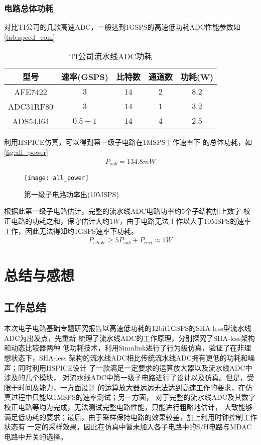     \subsubsection{电路总体功耗}
    对比TI公司的几款高速ADC，一般达到1GSPS的高速低功耗ADC性能参数如\autoref{tab:speed_com}
    \begin{table}[ht]
        \centering
        \caption{\label{tab:speed_com}TI公司流水线ADC功耗}
        \begin{tabular}{|c|c|c|c|c|}
            \hline
            型号 & 速率(GSPS) & 比特数 & 通道数 & 功耗(W) \\ \hline
            AFE7422 & $3$ & $ 14 $ & $2$ & $ 8.2 $ \\ \hline
            ADC31RF80 & $3$ & $ 14 $ & $1$ & $ 3.2 $ \\ \hline
            ADS54J64 & $0.5-1$ & $ 14 $ & $4$ & $ 2.5 $ \\ \hline
        \end{tabular}
    \end{table}
    \par 利用HSPICE仿真，可以得到第一级子电路在1MSPS工作速率下
    的总体功耗，如\autoref{fig:all_power}
    \begin{align}
        P_{sub} = 134.8mW
    \end{align}
    \begin{figure}[H]
        \centering
        \texttt{[image: all\_power]}
        \caption{\label{fig:all_power}第一级子电路功率出(10MSPS)}
    \end{figure}
    \par 根据此第一级子电路估计，完整的流水线ADC电路功率约5个子结构加上数字
    校正电路的功耗之和，保守估计大约$ 1W $，由于电路无法工作以大于10MSPS的速率
    工作，因此无法得知约1GSPS速率下功耗。
    \begin{align}
        P_{whole} \geq 5P_{sub} + P_{rect} \approx 1W
    \end{align}

\section{总结与感想}
    \subsection{工作总结}
    本次电子电路基础专题研究报告以高速低功耗的12bit1GSPS的SHA-less型流水线ADC为出发点，先重新
    梳理了流水线ADC的工作原理，分别探究了SHA-less架构和动态比较器两种
    低功耗技术，利用Simulink进行了行为级仿真，验证了在非理想状态下，SHA-less
    架构的流水线ADC相比传统流水线ADC拥有更低的功耗和噪声；同时利用HSPICE设计
    了一款满足一定要求的运算放大器以及流水线ADC中涉及的几个模块，
    对流水线ADC中第一级子电路进行了设计以及仿真。但是，受限于时间及能力，一方面设计
    的运算放大器远远无法达到高速工作的要求，在仿真过程中只能以1MSPS的速率测试；另一方面，
    对于完整的流水线ADC及其数字校正电路等均为完成，无法测试完整电路性能，只能进行粗略地估计，
    大致能够满足低功耗的要求；最后，由于采样保持电路的效果较差，加上利用时钟控制工作状态有
    一定的采样效果，因此在仿真中暂未加入各子电路中的S/H电路与MDAC电路中开关的选择。
    
